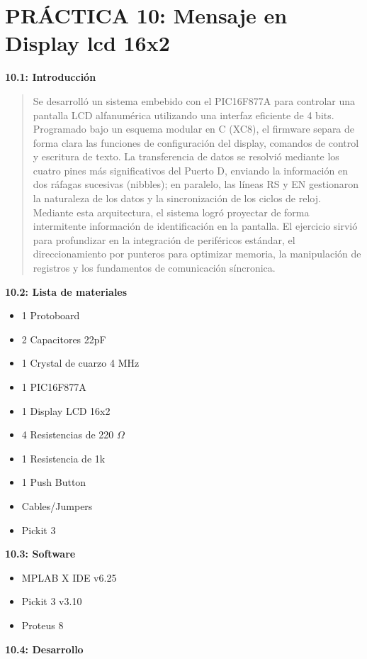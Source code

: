 \section*{\textbf{PRÁCTICA 10: Mensaje en Display lcd 16x2}}
\textbf{10.1: Introducción}

\begin{quote}
Se desarrolló un sistema embebido con el PIC16F877A para controlar una pantalla LCD alfanumérica utilizando una interfaz eficiente de 4 bits. Programado bajo un esquema modular en C (XC8), el firmware separa de forma clara las funciones de configuración del display, comandos de control y escritura de texto. La transferencia de datos se resolvió mediante los cuatro pines más significativos del Puerto D, enviando la información en dos ráfagas sucesivas (nibbles); en paralelo, las líneas RS y EN gestionaron la naturaleza de los datos y la sincronización de los ciclos de reloj. Mediante esta arquitectura, el sistema logró proyectar de forma intermitente información de identificación en la pantalla. El ejercicio sirvió para profundizar en la integración de periféricos estándar, el direccionamiento por punteros para optimizar memoria, la manipulación de registros y los fundamentos de comunicación síncronica.

\end{quote}

 \textbf{10.2: Lista de materiales}
\begin{itemize}
    \item 1 Protoboard
    \item 2 Capacitores 22pF
    \item 1 Crystal de cuarzo 4 MHz
    \item 1 PIC16F877A
    \item 1 Display LCD 16x2
    \item 4 Resistencias de 220 $\Omega$
    \item 1 Resistencia de 1k
    \item 1 Push Button
    \item Cables/Jumpers
    \item Pickit 3

\end{itemize}
\textbf{10.3: Software}
\begin{itemize}
    \item MPLAB X IDE v6.25
    \item Pickit 3 v3.10
    \item Proteus 8
\end{itemize}
\textbf{10.4: Desarrollo}

